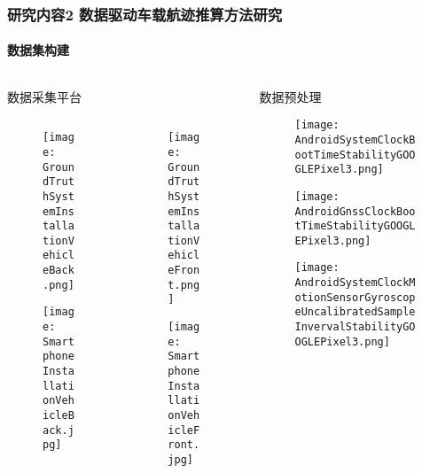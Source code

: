 \begin{frame}[t] 
 	\frametitle{研究内容2 数据驱动车载航迹推算方法研究}
 	\framesubtitle{数据集构建}
 	\vspace{-0.4cm}
	\begin{columns}[t]
		\begin{column}{0.5\textwidth}
		    \vspace{-0.4cm}
		    数据采集平台
			\begin{columns}[t]
				\begin{column}{0.5\textwidth} 
				   	\begin{figure}
		    			\texttt{[image: GroundTruthSystemInstallationVehicleBack.png]}
				   	\end{figure}
				   	\vspace{-0.4cm}
				   	\begin{figure}
						\texttt{[image: SmartphoneInstallationVehicleBack.jpg]}
				   	\end{figure}   
				\end{column}   
				\begin{column}{0.5\textwidth}
				   	\begin{figure}
		    			\texttt{[image: GroundTruthSystemInstallationVehicleFront.png]}
				   	\end{figure}
				   	\vspace{-0.4cm}
				   	\begin{figure}
						\texttt{[image: SmartphoneInstallationVehicleFront.jpg]}
				   	\end{figure}  		
				\end{column}
			\end{columns}  
		\end{column}   
		\begin{column}{0.5\textwidth}
		    数据预处理 \hspace{0.2cm}{\footnotesize 对比系统时钟和GNSS时钟}
		   	\begin{figure}
    			\texttt{[image: AndroidSystemClockBootTimeStabilityGOOGLEPixel3.png]}
		   	\end{figure}
		   	\vspace{-0.5cm}
		   	\begin{figure}
				\texttt{[image: AndroidGnssClockBootTimeStabilityGOOGLEPixel3.png]}
		   	\end{figure}
		   	\vspace{-0.5cm}
		   	\begin{figure}
				\texttt{[image: AndroidSystemClockMotionSensorGyroscopeUncalibratedSampleInvervalStabilityGOOGLEPixel3.png]}
		   	\end{figure} 
		\end{column}
	\end{columns}
\end{frame}

